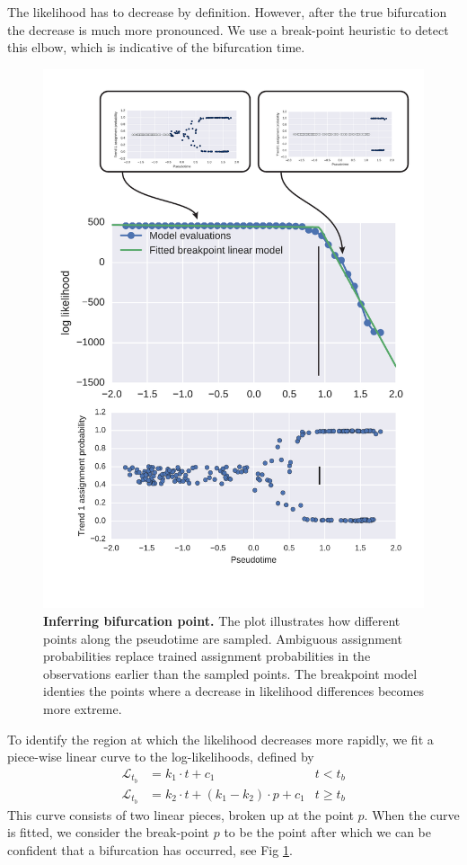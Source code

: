 The likelihood has to decrease by definition. However, after the true bifurcation the decrease is much more pronounced. We use a break-point heuristic to detect this elbow, which is indicative of the bifurcation time.

\begin{figure}
    \centering
    \includegraphics[width=\textwidth]{"fig-bifurcation-detection"}
    \caption[Inferring bifurcation point]{\textbf{Inferring bifurcation point.} The plot illustrates how different points along the pseudotime are sampled. Ambiguous assignment probabilities replace trained assignment probabilities in the observations earlier than the sampled points. The breakpoint model identies the points where a decrease in likelihood differences becomes more extreme.}
    \label{fig:bifdetection}
\end{figure}

To identify the region at which the likelihood decreases more rapidly, we fit a piece-wise linear curve to the log-likelihoods, defined by
\begin{align*}
\mathcal{L}_{t_b} &= k_1 \cdot t + c_1 & t < t_b \\
\mathcal{L}_{t_b} &= k_2 \cdot t + (k_1 - k_2) \cdot p + c_1 & t \geq t_b
\end{align*}
This curve consists of two linear pieces, broken up at the point $ p $. When the curve is fitted, we consider the break-point $ p $ to be the point after which we can be confident that a bifurcation has occurred, see Fig \ref{fig:bifdetection}.

